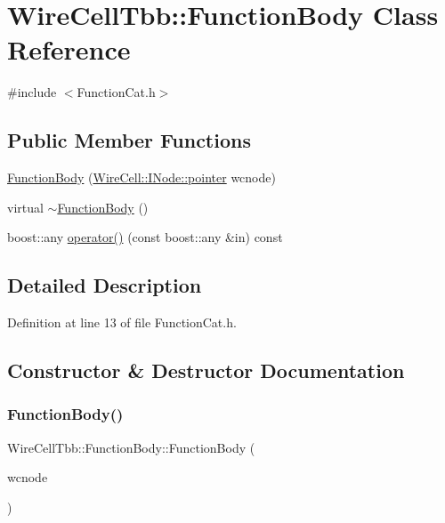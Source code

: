 \hypertarget{class_wire_cell_tbb_1_1_function_body}{}\section{Wire\+Cell\+Tbb\+:\+:Function\+Body Class Reference}
\label{class_wire_cell_tbb_1_1_function_body}


{\ttfamily \#include $<$Function\+Cat.\+h$>$}

\subsection*{Public Member Functions}
\begin{DoxyCompactItemize}
\item 
\hyperlink{class_wire_cell_tbb_1_1_function_body_a45eb7413a6df6a38175a7650aba14e0a}{Function\+Body} (\hyperlink{class_wire_cell_1_1_interface_a09c548fb8266cfa39afb2e74a4615c37}{Wire\+Cell\+::\+I\+Node\+::pointer} wcnode)
\item 
virtual \hyperlink{class_wire_cell_tbb_1_1_function_body_a9ac1d28cd025798a442540cab57267a6}{$\sim$\+Function\+Body} ()
\item 
boost\+::any \hyperlink{class_wire_cell_tbb_1_1_function_body_a56c143656aa5a45ec3ddfdd7e4ae065d}{operator()} (const boost\+::any \&in) const
\end{DoxyCompactItemize}


\subsection{Detailed Description}


Definition at line 13 of file Function\+Cat.\+h.



\subsection{Constructor \& Destructor Documentation}
\mbox{\label{class_wire_cell_tbb_1_1_function_body_a45eb7413a6df6a38175a7650aba14e0a}} 
\subsubsection{\texorpdfstring{Function\+Body()}{FunctionBody()}}
{\footnotesize\ttfamily Wire\+Cell\+Tbb\+::\+Function\+Body\+::\+Function\+Body (\begin{DoxyParamCaption}\item[{\hyperlink{class_wire_cell_1_1_interface_a09c548fb8266cfa39afb2e74a4615c37}{Wire\+Cell\+::\+I\+Node\+::pointer}}]{wcnode }\end{DoxyParamCaption})\hspace{0.3cm}{\ttfamily [inline]}}



